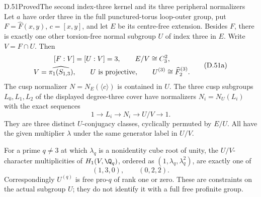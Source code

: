 \begin{claim}{D.51}{Proved}{The second index-three kernel and its three peripheral normalizers}
Let $a$ have order three in the full punctured-torus
loop-outer group, put $F=\widehat F(x,y)$,
$c=[x,y]$, and let $E$ be its centre-free extension.
Besides $F$, there is exactly one other torsion-free
normal subgroup $U$ of index three in $E$.
Write $V=F\cap U$. Then
\[
 \begin{gathered}
 [F:V]=[U:V]=3,\qquad E/V\cong C_3^2,\\
 V=\widehat{\pi_1(S_{1,3})},\qquad
 U\ \hbox{is projective},\qquad
 U^{(3)}\cong\widehat F^{(3)}_2 .
 \end{gathered}                                         \tag{D.51a}
\]
The cusp normalizer $N=N_E(\langle c\rangle)$
is contained in $U$. The three cusp subgroups
$L_0,L_1,L_2$ of the displayed degree-three
cover have normalizers $N_i=N_U(L_i)$ with
the exact sequences
\[
              1\longrightarrow L_i
                 \longrightarrow N_i
                 \longrightarrow U/V\longrightarrow1.
                                                        \tag{D.51b}
\]
They are three distinct $U$-conjugacy classes,
cyclically permuted by $E/U$. All have the
given multiplier $\lambda$ under the same
generator label in $U/V$.

For a prime $q\ne3$ at which $\lambda_q$ is
a nonidentity cube root of unity, the
$U/V$-character multiplicities of
$H_1(V,\Q_q)$, ordered as $(1,\lambda_q,\lambda_q^2)$,
are exactly one of
\[
                         (1,3,0),\qquad (0,2,2).
                                                        \tag{D.51c}
\]
Correspondingly $U^{(q)}$ is free pro-$q$ of rank
one or zero. These are constraints on the actual
subgroup $U$; they do not identify it with a full
free profinite group.
\end{claim}
